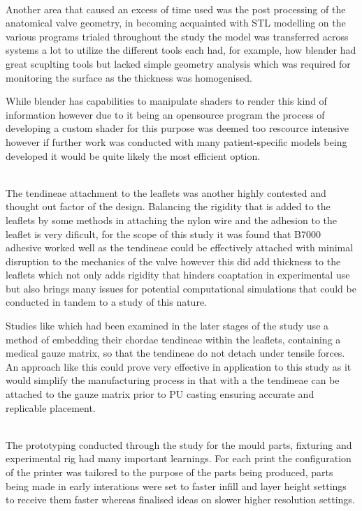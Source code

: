 \\
Another area that caused an excess of time used was the post processing of the anatomical valve geometry, in becoming acquainted with STL modelling on the various programs trialed throughout the study the model was transferred across systems a lot to utilize the different tools each had, for example, how blender had great scuplting tools but lacked simple geometry analysis which was required for monitoring the surface as the thickness was homogenised.

While blender has capabilities to manipulate shaders to render this kind of information however due to it being an opensource program the process of developing a custom shader for this purpose was deemed too rescource intensive however if further work was conducted with many patient-specific models being developed it would be quite likely the most efficient option.

\\
The tendineae attachment to the leaflets was another highly contested and thought out factor of the design. Balancing the rigidity that is added to the leaflets by some methods in attaching the nylon wire and the adhesion to the leaflet is very dificult, for the scope of this study it was found that B7000 adhesive worked well as the tendineae could be effectively attached with minimal disruption to the mechanics of the valve however this did add thickness to the leaflets which not only adds rigidity that hinders coaptation in experimental use but also brings many issues for potential computational simulations that could be conducted in tandem to a study of this nature.

Studies like  which had been examined in the later stages of the study use a method of embedding their chordae tendineae within the leaflets, containing a medical gauze matrix, so that the tendineae do not detach under tensile forces. An approach like this could prove very effective in application to this study as it would simplify the manufacturing process in that with a the tendineae can be attached to the gauze matrix prior to \gls{PU} casting ensuring accurate and replicable placement.

\\
The prototyping conducted through the study for the mould parts, fixturing and experimental rig had many important  learnings. For each print the configuration of the printer was tailored to the purpose of the parts being produced, parts being made in early interations were set to faster infill and layer height settings to receive them faster whereas finalised ideas on slower higher resolution settings.

